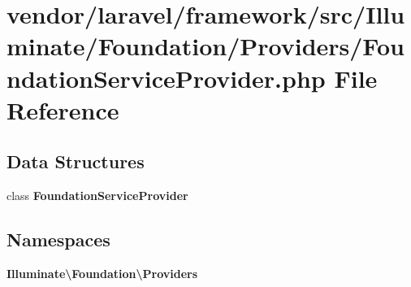 \section{vendor/laravel/framework/src/\+Illuminate/\+Foundation/\+Providers/\+Foundation\+Service\+Provider.php File Reference}
\label{_foundation_service_provider_8php}
\subsection*{Data Structures}
\begin{DoxyCompactItemize}
\item 
class {\bf Foundation\+Service\+Provider}
\end{DoxyCompactItemize}
\subsection*{Namespaces}
\begin{DoxyCompactItemize}
\item 
 {\bf Illuminate\textbackslash{}\+Foundation\textbackslash{}\+Providers}
\end{DoxyCompactItemize}
